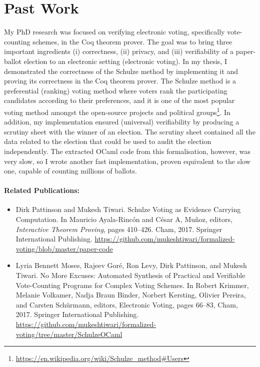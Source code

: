 \documentclass[a4paper]{article}
\begin{document}
\section{Past Work}
My PhD research was focused on verifying electronic voting, specifically vote-counting schemes, in 
the Coq theorem prover. The goal was to 
bring  three important ingredients (i) correctness, (ii) privacy, and (iii) verifiability of a 
paper-ballot election to 
an electronic setting (electronic voting).
In my thesis, I demonstrated the correctness of the Schulze method 
by implementing it and proving its correctness in the Coq theorem 
prover. The Schulze method is a preferential (ranking) voting method where voters rank the participating 
candidates according to their preferences, and it is one of the most popular voting method 
amongst the open-source projects and 
political groups\footnote{\url{https://en.wikipedia.org/wiki/Schulze_method#Users}}.
In addition, my implementation 
ensured (universal) verifiability by producing a scrutiny sheet 
with the winner of an election. The scrutiny sheet contained all the data related 
to the election that could be used to audit the election independently. 
The extracted OCaml code from this formalisation, however, was 
very slow, so I wrote another fast implementation, proven equivalent to the slow one,
capable of counting millions of ballots.

\paragraph{Related Publications:}
\begin{itemize}
    \item {Dirk Pattinson and Mukesh Tiwari.} {Schulze Voting as Evidence Carrying Computation}. 
    {In Mauricio Ayala-Rinc{\'o}n 
    and C{\'e}sar A, Mu{\~{n}}oz, editors, \textit{Interactive Theorem Proving}, pages 410--426.
    Cham, 2017. Springer International Publishing.}
    {\url{https://github.com/mukeshtiwari/formalized-voting/blob/master/paper-code}}
    \item {Lyria Bennett Moses, Rajeev Gor{\'e}, Ron Levy, Dirk Pattinson, and Mukesh Tiwari.}
    {No More Excuses: Automated Synthesis of Practical and Verifiable Vote-Counting Programs for Complex Voting Schemes.}
    {In Robert Krimmer, Melanie Volkamer, Nadja Braun Binder, Norbert Kersting, Olivier Pereira, and Carsten Sch{\"u}rmann, 
    editors, Electronic Voting, pages 66--83, Cham, 2017. Springer International Publishing.}
    {\url{https://github.com/mukeshtiwari/formalized-voting/tree/master/SchulzeOCaml}}
\end{itemize}
\end{document}
